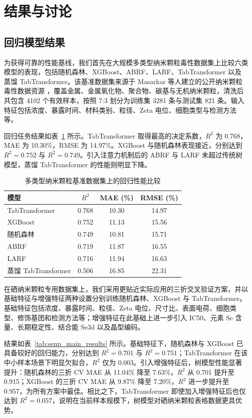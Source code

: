\section{结果与讨论}

\subsection{回归模型结果}
为获得可靠的性能基线，我们首先在大规模多类型纳米颗粒毒性数据集上比较六类模型的表现，包括随机森林、XGBoost、ABRF、LARF、TabTransformer 以及蒸馏 TabTransformer。该基准数据集来源于 Masarkar 等人建立的公开纳米颗粒毒性数据资源 \cite{masarkar2024}，覆盖金属、金属氧化物、聚合物、碳基与无机纳米颗粒，清洗后共包含 4102 个有效样本，按照 7:3 划分为训练集 3281 条与测试集 821 条。输入特征包括浓度、暴露时间、材料类别、粒径、Zeta 电位、细胞类型与检测方法等。

回归任务结果如表~\ref{tab:benchmark_regression} 所示。TabTransformer 取得最高的决定系数，$R^2$ 为 0.768，MAE 为 10.30\%，RMSE 为 14.97\%。XGBoost 与随机森林表现接近，分别达到 $R^2=0.752$ 与 $R^2=0.749$。引入注意力机制后的 ABRF 与 LARF 未超过传统树模型，蒸馏 TabTransformer 的性能则明显下降。

\begin{table}[htbp]
  \centering
  \caption{多类型纳米颗粒基准数据集上的回归性能比较}
  \label{tab:benchmark_regression}
  \begin{tabular}{lccc}
    \hline
    模型 & $R^2$ & MAE (\%) & RMSE (\%) \\
    \hline
    TabTransformer & 0.768 & 10.30 & 14.97 \\
    XGBoost & 0.752 & 11.13 & 15.56 \\
    随机森林 & 0.749 & 10.81 & 15.71 \\
    ABRF & 0.719 & 11.87 & 16.55 \\
    LARF & 0.716 & 11.94 & 16.63 \\
    蒸馏 TabTransformer & 0.506 & 16.85 & 22.31 \\
    \hline
  \end{tabular}
\end{table}

在硒纳米颗粒专用数据集上，我们采用更贴近实际应用的三折交叉验证方案，并以基础特征与增强特征两种设置分别训练随机森林、XGBoost 与 TabTransformer。基础特征包括浓度、暴露时间、粒径、Zeta 电位、尺寸比、表面电荷、细胞类型、修饰基团和检测方法等；增强特征在此基础上进一步引入 IC50、元素 Se 含量、长期稳定性、结合能 Se3d 以及晶型编码。

结果如表~\ref{tab:senp_main_results} 所示。基础特征下，随机森林与 XGBoost 已具备较好的回归能力，分别达到 $R^2=0.701$ 与 $R^2=0.751$；TabTransformer 在该中小样本场景下明显欠拟合，$R^2$ 仅为 0.003。引入增强特征后，树模型性能显著提升：随机森林的三折 CV MAE 从 11.04\% 降至 7.63\%，$R^2$ 从 0.701 提升至 0.915；XGBoost 的三折 CV MAE 从 9.87\% 降至 7.20\%，$R^2$ 进一步提升至 0.957，为所有方案中最佳。相比之下，TabTransformer 即使加入增强特征后也仅达到 $R^2=0.057$，说明在当前样本规模下，树模型对硒纳米颗粒表格数据更具优势。

